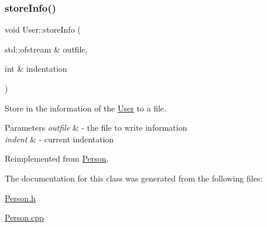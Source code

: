 \mbox{\label{class_user_aac5ff0f6899f3ce56d1b2d12ed557c79}} 
\subsubsection{\texorpdfstring{store\+Info()}{storeInfo()}}
{\footnotesize\ttfamily void User\+::store\+Info (\begin{DoxyParamCaption}\item[{std\+::ofstream \&}]{outfile,  }\item[{int \&}]{indentation }\end{DoxyParamCaption})\hspace{0.3cm}{\ttfamily [virtual]}}



Store in the information of the \mbox{\hyperlink{class_user}{User}} to a file. 


\begin{DoxyParams}{Parameters}
{\em outfile} & -\/ the file to write information \\
\hline
{\em indent} & -\/ current indentation \\
\hline
\end{DoxyParams}


Reimplemented from \mbox{\hyperlink{class_person_a80f87df3f644706c2ad8fc8b800fdd95}{Person}}.



The documentation for this class was generated from the following files\+:\begin{DoxyCompactItemize}
\item 
\mbox{\hyperlink{_person_8h}{Person.\+h}}\item 
\mbox{\hyperlink{_person_8cpp}{Person.\+cpp}}\end{DoxyCompactItemize}

